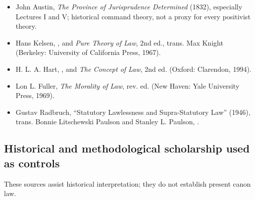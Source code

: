 \begin{itemize}
\item John Austin, \emph{The Province of Jurisprudence Determined} (1832), especially Lectures I and V; historical command theory, not a proxy for every positivist theory.
\item Hans Kelsen, , and \emph{Pure Theory of Law}, 2nd ed., trans. Max Knight (Berkeley: University of California Press, 1967).
\item H. L. A. Hart, , and \emph{The Concept of Law}, 2nd ed. (Oxford: Clarendon, 1994).
\item Lon L. Fuller, \emph{The Morality of Law}, rev. ed. (New Haven: Yale University Press, 1969).
\item Gustav Radbruch, ``Statutory Lawlessness and Supra-Statutory Law'' (1946), trans. Bonnie Litschewski Paulson and Stanley L. Paulson, .
\end{itemize}

\subsection{Historical and methodological scholarship used as controls}

These sources assist historical interpretation; they do not establish present canon law.

